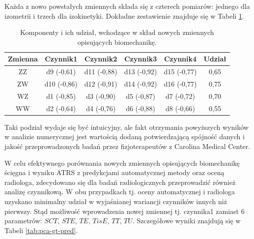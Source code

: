 Każda z nowo powstałych zmiennych składa się z czterech pomiarów: jednego dla izometrii i trzech dla izokinetyki. Dokładne zestawienie znajduje się w Tabeli \ref{tab:bio-new-factors}.

\begin{table}[h]
	\centering
	\setlength{\tabcolsep}{3pt}
	\setlength\extrarowheight{2pt}
	\caption{Komponenty i ich udział, wchodzące w skład nowych zmiennych opisujących biomechanikę.}
	\label{tab:bio-new-factors}
	\begin{tabular}{c|c|c|c|c||c}
		Zmienna&Czynnik1&Czynnik2&Czynnik3&Czynnik4&Udział \\
		\hline \hline
		ZZ&d9 (-0,61)&d11 (-0,88)&d13 (-0,92)&d15 (-0,77)&0,65\\
		\hline
		ZW&d10 (-0,86)&d12 (-0,91)&d14 (-0,92)&d16 (-0,77)&0,75\\
		\hline
		WZ&d1 (-0,85)&d3 (-0,90)&d5 (-0,87)&d7 (-0,72)&0,70\\
		\hline
		WW&d2 (-0,64)&d4 (-0,76)&d6 (-0,88)&d8 (-0,66)&0,55\\
		
			
	\end{tabular}
\end{table}

Taki podział wydaje się być intuicyjny, ale fakt otrzymania powyższych wyników w analizie numerycznej jest wartością dodaną potwierdzającą spójność danych i jakość przeprowadzonych badań przez fizjoterapeutów z Carolina Medical Center. 

W celu efektywnego porównania nowych zmiennych opisujących biomechanikę ścięgna i wyniku ATRS z predykcjami automatycznej metody oraz oceną radiologa, zdecydowano się dla badań radiologicznych przeprowadzić również analizę czynnikową. W obu przypadkach tj. oceny automatycznej i radiologa uzyskano minimalny udział w wyjaśnianej wariancji czynników innych niż pierwszy. Stąd możliwość wprowadzenia nowej zmiennej tj. czynnika1 zamiast 6 parametrów: $SCT$, $STE$, $TE$, $TisE$, $TT$, $TU$. Szczegółowe wyniki znajdują się w Tabeli \ref{tab:pca-gt-pred}.

